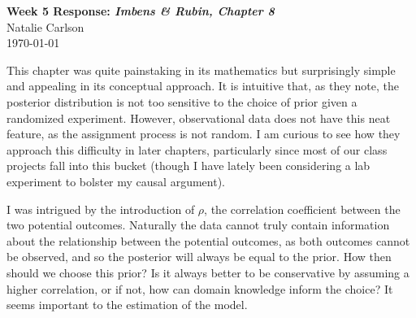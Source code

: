 \documentclass[12pt]{article}
\begin{document}
\begin{center}
  \Large \textbf{Week 5 Response: \textit{Imbens \& Rubin, Chapter 8}} \\
  \vspace{0.1in}
  \normalsize Natalie Carlson \\
  \today
\end{center}

This chapter was quite painstaking in its mathematics but surprisingly simple and appealing in its conceptual approach. It is intuitive that, as they note, the posterior distribution is not too sensitive to the choice of prior given a randomized experiment. However, observational data does not have this neat feature, as the assignment process is not random. I am curious to see how they approach this difficulty in later chapters, particularly since most of our class projects fall into this bucket (though I have lately been considering a lab experiment to bolster my causal argument).

I was intrigued by the introduction of $\rho$, the correlation coefficient between the two potential outcomes. Naturally the data cannot truly contain information about the relationship between the potential outcomes, as both outcomes cannot be observed, and so the posterior will always be equal to the prior. How then should we choose this prior? Is it always better to be conservative by assuming a higher correlation, or if not, how can domain knowledge inform the choice? It seems important to the estimation of the model.
\end{document}
